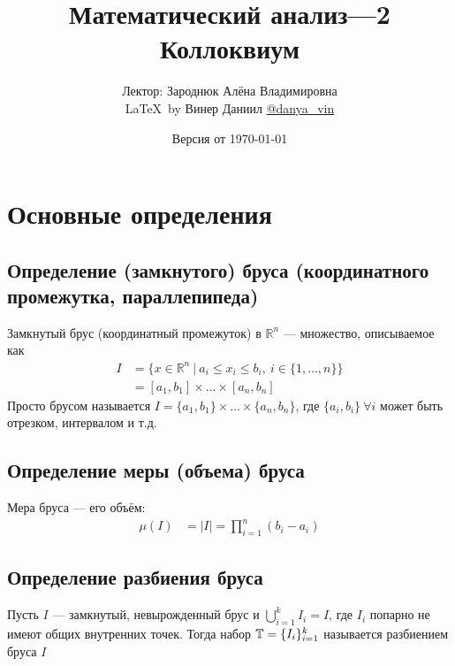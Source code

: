 \documentclass[a4paper]{article}
\begin{document}
\title{\LARGE{Математический анализ—2}\\ Коллоквиум}
\author{Лектор: Зароднюк Алёна Владимировна\\\LaTeX\ by Винер Даниил \href{https://t.me/danya_vin}{@danya\_vin}}
\date{Версия от \today}
\maketitle

\tableofcontents
\newpage
\setlength{\parindent}{15pt}
\setlength{\parskip}{2mm}
\section{Основные определения}
\subsection{Определение (замкнутого) бруса (координатного промежутка, параллепипеда)}
 Замкнутый брус (координатный промежуток) в $\mathbb{R}^n$ — множество, описываемое как
\begin{equation*}
\begin{aligned}
    I&=\{x\in\mathbb{R}^n\ |\ a_i\leqslant x_i\leqslant b_i,\ i\in\{1,\ldots,n\}\}\\
    &=\left[a_1,b_1\right]\times\ldots\times\left[a_n,b_n\right]
\end{aligned}
\end{equation*}
\comment Просто брусом называется $I=\{a_1,b_1\}\times\ldots\times\{a_n,b_n\}$, где $\{a_i,b_i\}\ \forall i$ может быть отрезком, интервалом и т.д.

\subsection{Определение меры (объема) бруса}
 Мера бруса — его объём:
\begin{equation*}
    \begin{aligned}
        \mu(I)&=|I|
        =\prod_{i=1}^{n} (b_i-a_i)
    \end{aligned}
\end{equation*}


\subsection{Определение разбиения бруса}
 Пусть $I$ — замкнутый, невырожденный брус и $\displaystyle\bigcup_{i=1}^kI_i = I$, где $I_i$ попарно не имеют общих внутренних точек. Тогда набор $\operatorname{\mathbb{T}} = \{I_i\}_{i=1}^k$ называется разбиением бруса $I$
\end{document}
